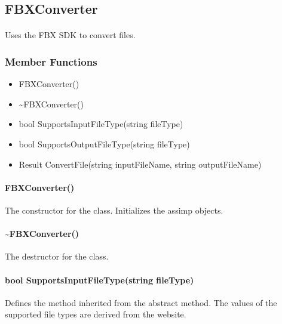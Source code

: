 \hypertarget{fileconversion_fbxconverter}
{
    \label{fileconversion_fbxconverter}
}

\subsection{FBXConverter}
    \paragraph{}
        Uses the FBX SDK to convert files.

    \subsubsection{Member Functions}

        \begin{itemize}
            \item FBXConverter()
            \item \textasciitilde FBXConverter()
            \item bool SupportsInputFileType(string fileType)
            \item bool SupportsOutputFileType(string fileType)
            \item Result ConvertFile(string inputFileName, string outputFileName)
        \end{itemize}

        \paragraph{FBXConverter()}
            \hfill \break
            The constructor for the class. Initializes the assimp objects.   
        
        \paragraph{\textasciitilde FBXConverter()}
            \hfill \break
            The destructor for the class.

        \paragraph{bool SupportsInputFileType(string fileType)}
            \hfill \break
            Defines the method inherited from the abstract method.  The values of the supported file types are derived from the website.

